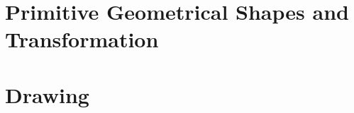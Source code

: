 \documentclass[DIV         = 14,
               fontsize    = 10,
               index       = totoc,
               twoside,
               cadre,
               headings    = small
               ]{tkz-doc}
\begin{document}
 
  
\parindent=0pt
\clearpage

\clearpage
\tableofcontents

\clearpage
\newpage

\part{Primitive Geometrical Shapes and Transformation}


\part{Drawing}

\clearpage\newpage
\small\printindex
\end{document}
